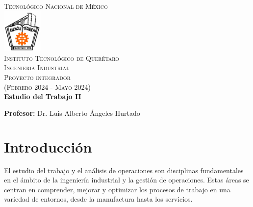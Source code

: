 \documentclass[letterpaper,12pt,openright,oneside]{article}
\theoremstyle{plain}
\begin{document}
\begin{titlepage}
\begin{center}


\textsc{\LARGE Tecnológico Nacional de México}\\[0.6 cm]
\includegraphics[width=0.15\textwidth]{img/ITQNN.jpg}~\\[0.45cm]
\textsc{\Large Instituto Tecnológico de Querétaro \\ \large{Ingeniería Industrial}}\\[0.5 cm]
\textsc{\large Proyecto integrador \\ (Febrero 2024 - Mayo 2024)}\\[4.5cm]

{ 
\huge \bfseries
Estudio del Trabajo II
\\[0.4cm] }
\vspace*{1.5cm}

\textbf{Profesor:} Dr. Luis Alberto Ángeles Hurtado\\\vspace*{0.5cm}

\raggedright

\vfill
\centering
\end{center}
\end{titlepage}

\hypersetup{linkcolor=black}
% 
\renewcommand\contentsname{\centering \'INDICE}
\tableofcontents
\newpage
\linenumbers
% 
%
\section{Introducción}
El estudio del trabajo y el análisis de operaciones son disciplinas fundamentales en el ámbito de la ingeniería industrial y la gestión de operaciones. Estas áreas se centran en comprender, mejorar y optimizar los procesos de trabajo en una variedad de entornos, desde la manufactura hasta los servicios.
\end{document}
